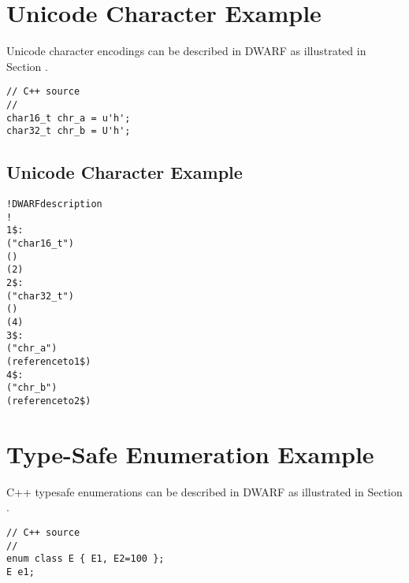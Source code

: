 \section{Unicode Character Example}
\label{app:unicodecharacterexample}

Unicode character encodings can be described in DWARF as
illustrated in 
Section .

\begin{lstlisting}
// C++ source
//
char16_t chr_a = u'h';
char32_t chr_b = U'h';
\end{lstlisting}

\subsection{Unicode Character Example}
\label{app:unicodecharacterexamplesub}
\begin{alltt}

! DWARF description
!
1\$: 
        ("char16\_t")
        ()
        (2)
2\$: 
        ("char32\_t")
        ()
        (4)
3\$: 
        ("chr\_a")
        (reference to 1\$)
4\$: 
        ("chr\_b")
        (reference to 2\$)
\end{alltt}



\section{Type-Safe Enumeration Example}
\label{app:typesafeenumerationexample}


C++ type\dash safe enumerations can be described in DWARF as illustrated in 
Section .

\begin{lstlisting}
// C++ source
//
enum class E { E1, E2=100 };
E e1;
\end{lstlisting}

